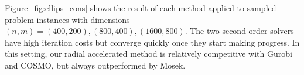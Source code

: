 \documentclass[sn-mathphys,Numbered]{sn-jnl}%
\begin{document}

Figure~\ref{fig:ellips_cons} shows the result of each method applied to sampled problem instances with dimensions $(n,m)=(400,200), (800,400), (1600,800)$. The two second-order solvers have high iteration costs but converge quickly once they start making progress. In this setting, our radial accelerated method is relatively competitive with Gurobi and COSMO, but always outperformed by Mosek. 
\end{document}
